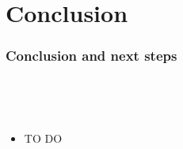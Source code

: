 \section{Conclusion}

\begin{frame}
  \frametitle{Conclusion and next steps}
  \begin{description}[]
    \item[Conclusion] \hfill \\
    \begin{block}{}
    \end{block}
    \item[Next Steps] \hfill \\
      \begin{itemize}
        \item TO DO
      \end{itemize}
  \end{description} 
\end{frame}


